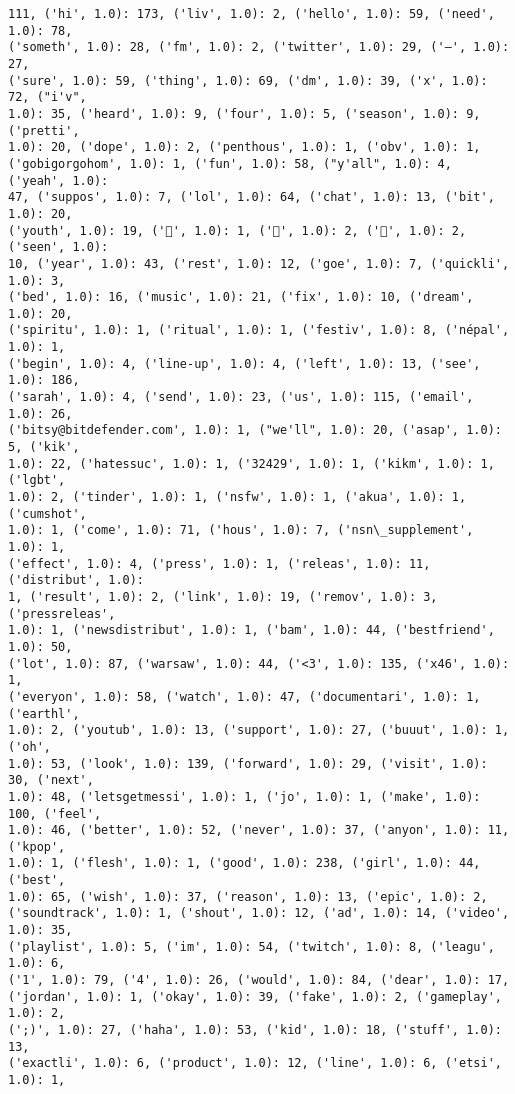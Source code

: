 \documentclass[11pt]{article}
\begin{document}
\begin{Verbatim}[commandchars=\\\{\}]
111, ('hi', 1.0): 173, ('liv', 1.0): 2, ('hello', 1.0): 59, ('need', 1.0): 78,
('someth', 1.0): 28, ('fm', 1.0): 2, ('twitter', 1.0): 29, ('—', 1.0): 27,
('sure', 1.0): 59, ('thing', 1.0): 69, ('dm', 1.0): 39, ('x', 1.0): 72, ("i'v",
1.0): 35, ('heard', 1.0): 9, ('four', 1.0): 5, ('season', 1.0): 9, ('pretti',
1.0): 20, ('dope', 1.0): 2, ('penthous', 1.0): 1, ('obv', 1.0): 1,
('gobigorgohom', 1.0): 1, ('fun', 1.0): 58, ("y'all", 1.0): 4, ('yeah', 1.0):
47, ('suppos', 1.0): 7, ('lol', 1.0): 64, ('chat', 1.0): 13, ('bit', 1.0): 20,
('youth', 1.0): 19, ('💅', 1.0): 1, ('🏽', 1.0): 2, ('💋', 1.0): 2, ('seen', 1.0):
10, ('year', 1.0): 43, ('rest', 1.0): 12, ('goe', 1.0): 7, ('quickli', 1.0): 3,
('bed', 1.0): 16, ('music', 1.0): 21, ('fix', 1.0): 10, ('dream', 1.0): 20,
('spiritu', 1.0): 1, ('ritual', 1.0): 1, ('festiv', 1.0): 8, ('népal', 1.0): 1,
('begin', 1.0): 4, ('line-up', 1.0): 4, ('left', 1.0): 13, ('see', 1.0): 186,
('sarah', 1.0): 4, ('send', 1.0): 23, ('us', 1.0): 115, ('email', 1.0): 26,
('bitsy@bitdefender.com', 1.0): 1, ("we'll", 1.0): 20, ('asap', 1.0): 5, ('kik',
1.0): 22, ('hatessuc', 1.0): 1, ('32429', 1.0): 1, ('kikm', 1.0): 1, ('lgbt',
1.0): 2, ('tinder', 1.0): 1, ('nsfw', 1.0): 1, ('akua', 1.0): 1, ('cumshot',
1.0): 1, ('come', 1.0): 71, ('hous', 1.0): 7, ('nsn\_supplement', 1.0): 1,
('effect', 1.0): 4, ('press', 1.0): 1, ('releas', 1.0): 11, ('distribut', 1.0):
1, ('result', 1.0): 2, ('link', 1.0): 19, ('remov', 1.0): 3, ('pressreleas',
1.0): 1, ('newsdistribut', 1.0): 1, ('bam', 1.0): 44, ('bestfriend', 1.0): 50,
('lot', 1.0): 87, ('warsaw', 1.0): 44, ('<3', 1.0): 135, ('x46', 1.0): 1,
('everyon', 1.0): 58, ('watch', 1.0): 47, ('documentari', 1.0): 1, ('earthl',
1.0): 2, ('youtub', 1.0): 13, ('support', 1.0): 27, ('buuut', 1.0): 1, ('oh',
1.0): 53, ('look', 1.0): 139, ('forward', 1.0): 29, ('visit', 1.0): 30, ('next',
1.0): 48, ('letsgetmessi', 1.0): 1, ('jo', 1.0): 1, ('make', 1.0): 100, ('feel',
1.0): 46, ('better', 1.0): 52, ('never', 1.0): 37, ('anyon', 1.0): 11, ('kpop',
1.0): 1, ('flesh', 1.0): 1, ('good', 1.0): 238, ('girl', 1.0): 44, ('best',
1.0): 65, ('wish', 1.0): 37, ('reason', 1.0): 13, ('epic', 1.0): 2,
('soundtrack', 1.0): 1, ('shout', 1.0): 12, ('ad', 1.0): 14, ('video', 1.0): 35,
('playlist', 1.0): 5, ('im', 1.0): 54, ('twitch', 1.0): 8, ('leagu', 1.0): 6,
('1', 1.0): 79, ('4', 1.0): 26, ('would', 1.0): 84, ('dear', 1.0): 17,
('jordan', 1.0): 1, ('okay', 1.0): 39, ('fake', 1.0): 2, ('gameplay', 1.0): 2,
(';)', 1.0): 27, ('haha', 1.0): 53, ('kid', 1.0): 18, ('stuff', 1.0): 13,
('exactli', 1.0): 6, ('product', 1.0): 12, ('line', 1.0): 6, ('etsi', 1.0): 1,

\end{Verbatim}
\end{document}
